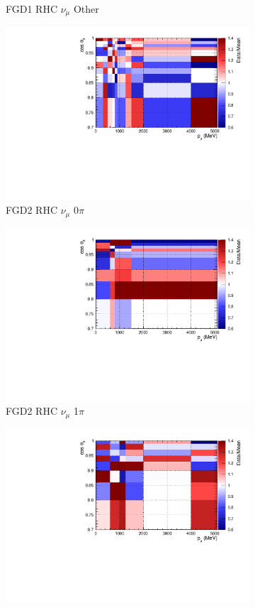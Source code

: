 \begin{figure}
\begin{subfigure}{.32\textwidth}
  \caption{FGD1 RHC $\nu_{\mu}$ Other}
  \label{fig:postpred_FGD1_NuMuBkg_CCOther_in_AntiNu_Mode}
\end{subfigure}
\begin{subfigure}{.32\textwidth}
  \centering
  \includegraphics[width=0.85\linewidth]{figs/postpred_FGD2_NuMuBkg_CC0pi_in_AntiNu_Mode.pdf}
  \caption{FGD2 RHC $\nu_{\mu}$ 0$\pi$}
  \label{fig:postpred_FGD2_NuMuBkg_CC0pi_in_AntiNu_Mode}
\end{subfigure}
\begin{subfigure}{.32\textwidth}
  \centering
  \includegraphics[width=0.85\linewidth]{figs/postpred_FGD2_NuMuBkg_CC1pi_in_AntiNu_Mode.pdf}
  \caption{FGD2 RHC $\nu_{\mu}$ 1$\pi$}
  \label{fig:postpred_FGD2_NuMuBkg_CC1pi_in_AntiNu_Mode}
\end{subfigure}
\begin{subfigure}{.32\textwidth}
  \centering
  \includegraphics[width=0.85\linewidth]{figs/postpred_FGD2_NuMuBkg_CCOther_in_AntiNu_Mode.pdf}

\end{subfigure}
\end{figure}
